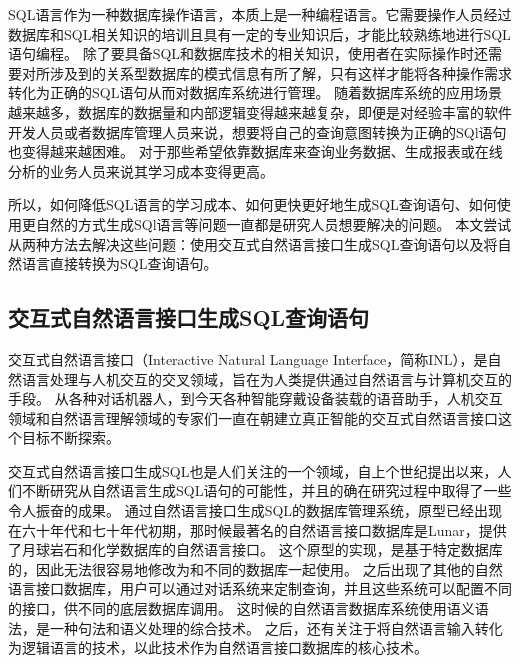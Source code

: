 SQL语言作为一种数据库操作语言，本质上是一种编程语言。它需要操作人员经过数据库和SQL相关知识的培训且具有一定的专业知识后，才能比较熟练地进行SQL语句编程。
除了要具备SQL和数据库技术的相关知识，使用者在实际操作时还需要对所涉及到的关系型数据库的模式信息有所了解，只有这样才能将各种操作需求转化为正确的SQL语句从而对数据库系统进行管理。
随着数据库系统的应用场景越来越多，数据库的数据量和内部逻辑变得越来越复杂，即便是对经验丰富的软件开发人员或者数据库管理人员来说，想要将自己的查询意图转换为正确的SQl语句也变得越来越困难。
对于那些希望依靠数据库来查询业务数据、生成报表或在线分析的业务人员来说其学习成本变得更高。

所以，如何降低SQL语言的学习成本、如何更快更好地生成SQL查询语句、如何使用更自然的方式生成SQl语言等问题一直都是研究人员想要解决的问题。
本文尝试从两种方法去解决这些问题：使用交互式自然语言接口生成SQL查询语句以及将自然语言直接转换为SQL查询语句。

\subsection{交互式自然语言接口生成SQL查询语句}
\label{intro:nli2sql}
交互式自然语言接口（Interactive Natural Language Interface，简称INL），是自然语言处理与人机交互的交叉领域，旨在为人类提供通过自然语言与计算机交互的手段。
从各种对话机器人，到今天各种智能穿戴设备装载的语音助手，人机交互领域和自然语言理解领域的专家们一直在朝建立真正智能的交互式自然语言接口这个目标不断探索。

交互式自然语言接口生成SQL\cite{Androutsopoulos1995Natural}也是人们关注的一个领域，自上个世纪提出以来，人们不断研究从自然语言生成SQL语句的可能性，并且的确在研究过程中取得了一些令人振奋的成果。
通过自然语言接口生成SQL的数据库管理系统，原型已经出现在六十年代和七十年代初期，那时候最著名的自然语言接口数据库是Lunar\cite{woods1972lunar}，提供了月球岩石和化学数据库的自然语言接口。
这个原型的实现，是基于特定数据库的，因此无法很容易地修改为和不同的数据库一起使用。
之后出现了其他的自然语言接口数据库，用户可以通过对话系统来定制查询，并且这些系统可以配置不同的接口，供不同的底层数据库调用。
这时候的自然语言数据库系统使用语义语法，是一种句法和语义处理的综合技术。
之后，还有关注于将自然语言输入转化为逻辑语言\cite{alshawi1992core}的技术，以此技术作为自然语言接口数据库的核心技术。

